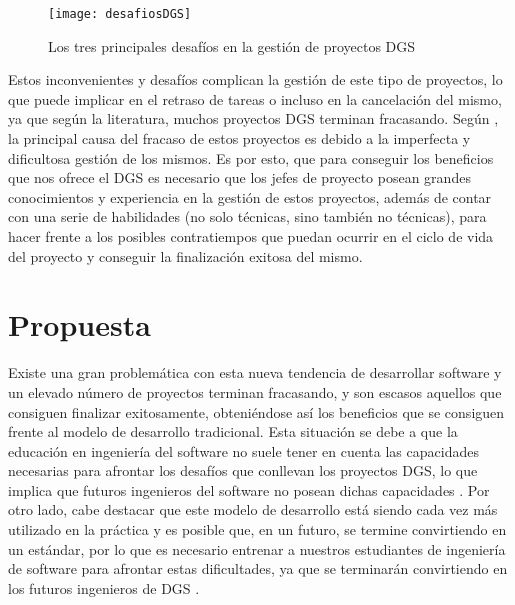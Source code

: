 \begin{figure}[htb]
	\centering
	\texttt{[image: desafiosDGS]}
	\caption[Desafíos en los proyectos DGS]{Los tres principales desafíos en la gestión de proyectos DGS}
	\label{fig:desafiosDGS}
\end{figure}

Estos inconvenientes y desafíos complican la gestión de este tipo de proyectos, lo que puede implicar en el retraso de tareas o incluso en la cancelación del mismo, ya que según la literatura, muchos proyectos DGS terminan fracasando. Según \cite{lino2015project}, la principal causa del fracaso de estos proyectos es debido a la imperfecta y dificultosa gestión de los mismos. Es por esto, que para conseguir los beneficios que nos ofrece el DGS es necesario que los jefes de proyecto posean grandes conocimientos y experiencia en la gestión de estos proyectos, además de contar con una serie de habilidades (no solo técnicas, sino también no técnicas), para hacer frente a los posibles contratiempos que puedan ocurrir en el ciclo de vida del proyecto y conseguir la finalización exitosa del mismo.


\section{Propuesta}
\label{sec:Propuesta}

Existe una gran problemática con esta nueva tendencia de desarrollar software y un elevado número de proyectos terminan fracasando, y son escasos aquellos que consiguen finalizar exitosamente, obteniéndose así los beneficios que se consiguen frente al modelo de desarrollo tradicional. Esta situación se debe a que la educación en ingeniería del software no suele tener en cuenta las capacidades necesarias para afrontar los desafíos que conllevan los proyectos DGS, lo que implica que futuros ingenieros del software no posean dichas capacidades \cite{monasor2010preparing}. Por otro lado, cabe destacar que este modelo de desarrollo está siendo cada vez más utilizado en la práctica y es posible que, en un futuro, se termine convirtiendo en un estándar, por lo que es necesario entrenar a nuestros estudiantes de ingeniería de software para afrontar estas dificultades, ya que se terminarán convirtiendo en los futuros ingenieros de DGS \cite{beecham2017best}.

